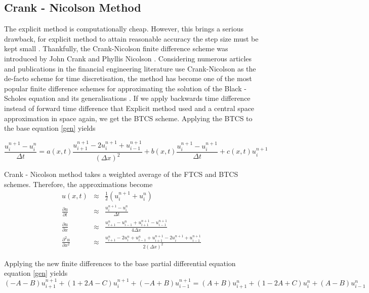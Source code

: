 \documentclass[12pt, oneside]{book}
\theoremstyle{plain}
\theoremstyle{definition}
\begin{document}
\subsection{Crank - Nicolson Method}
The explicit method is computationally cheap. However, this brings a serious drawback, for explicit method to attain reasonable accuracy the step size must be kept small \cite{gdsmith}. Thankfully, the Crank-Nicolson finite difference scheme was introduced by John Crank and Phyllis Nicolson \cite{cn}. Considering numerous articles and publications in the financial engineering literature use Crank-Nicolson as the de-facto scheme for time discretisation, the method has become one of the most popular finite difference schemes for approximating the solution of the Black - Scholes equation and its generalisations \cite{tavella}. If we apply backwards time difference instead of forward time difference that Explicit method used and a central space approximation in space again, we get the BTCS scheme. Applying the BTCS to the base equation \ref{gen} yields

\begin{equation}
\frac{u^{n+1}_i - u^n_i}{\Delta t}  = a(x, t)  \frac{u^{n+1}_{i+1}- 2u^{n+1}_i + u^{n+1}_{i-1}}{(\Delta x)^2}  + b(x, t)  \frac{u^{n+1}_i - u^{n+1}_i}{\Delta t}  + c(x, t)  u^{n+1}_i
\end{equation}

Crank - Nicolson method takes a weighted average of the FTCS and BTCS schemes. Therefore, the approximations become
\begin{eqnarray}
u(x, t) &\approx& \frac{1}{2} ( u^{n+1}_i +  u^n_i)\\
\frac{\partial u}{\partial t} &\approx & \frac{u^{n+1}_i - u^n_i}{\Delta t}\\
\frac{\partial u}{\partial x} &\approx & \frac{u^n_{i+1} - u^n_{i-1} + u^{n+1}_{i+1} - u^{n+1}_{i-1}}{4\Delta x} \\ 
\frac{\partial^2 u}{\partial x^2} &\approx & \frac{u^n_{i+1}- 2u^n_i + u^n_{i-1} + u^{n+1}_{i+1}- 2u^{n+1}_i + u^{n+1}_{i-1}}{2(\Delta x)^2}
\end{eqnarray}

Applying the new finite differences to the base partial differential equation equation \ref{gen} yields
\begin{equation}
(-A -B) u^{n+1}_{i+1} + (1 + 2A - C) u^{n+1}_i + (-A + B) u^{n+1}_{i-1} = (A + B) u^{n}_{i+1} + (1 - 2A + C) u^{n}_i + (A - B) u^{n}_{i-1}
\end{equation}
\end{document}
